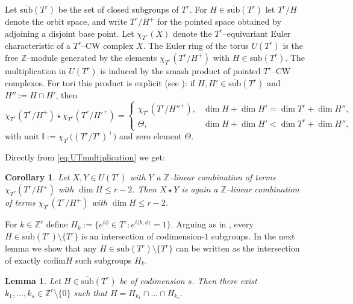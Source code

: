 \documentclass[reqno,twoside,12pt]{amsart}
\newtheorem{Corollary}[Remark]{Corollary}
\newtheorem{Lemma}[Remark]{Lemma}
\newcommand{\bI}{\mathbb{I}}
\newcommand{\bZ}{\mathbb{Z}}
\numberwithin{equation}{section} \errorcontextlines=0
\newcommand{\codim}{\mathrm{ codim  }}
\newcommand{\sub}{\overline{\mathrm{sub}}}
\begin{document}
Let $\sub(T^{r})$ be the set of closed subgroups of $T^{r}$. For $H\in\sub(T^{r})$ let $T^{r}/H$ denote the orbit space, and write $T^{r}/H^{+}$ for the pointed space obtained by adjoining a disjoint base point. Let $\chi_{T^{r}}(X)$ denote the $T^{r}$–equivariant Euler characteristic of a $T^{r}$–CW complex $X$. The Euler ring of the torus $U(T^{r})$ is the free $\mathbb{Z}$–module generated by the elements $\chi_{T^{r}}(T^{r}/H^{+})$ with $H\in\sub(T^{r})$. The multiplication in $U(T^r)$ is induced by the smash product of pointed $T^r$–CW complexes.
For tori this product is explicit (see \cite{GarRyb}): if $H,H'\in\sub(T^r)$ and $H'':=H\cap H'$, then
\begin{equation}\label{eq:UTmultiplication}
\chi_{T^r}(T^r/H^{+})\star\chi_{T^r}(T^r/H'^{+})=
\begin{cases}
\chi_{T^r}(T^r/H''^{+}), & \dim H+\dim H'=\dim T^r+\dim H'',\\[2pt]
\Theta, & \dim H+\dim H'<\dim T^r+\dim H'',
\end{cases}
\end{equation}
with unit $\bI:=\chi_{T^r}\bigl((T^r/T^r)^{+}\bigr)$ and zero element $\Theta$.

Directly from \eqref{eq:UTmultiplication} we get:

\begin{Corollary}\label{cor:bigcodim}
Let $X,Y\in U(T^r)$ with $Y$ a $\mathbb{Z}$–linear combination of terms $\chi_{T^r}(T^r/H^{+})$ with $\dim H\le r-2$.
Then $X\star Y$ is again a $\mathbb{Z}$–linear combination of terms $\chi_{T^r}(T^r/H^{+})$ with $\dim H\le r-2$.
\end{Corollary}

For $k\in\bZ^{r}$ define
$
H_k:= \{e^{i\phi}\in T^r: e^{i\langle k,\phi\rangle}=1 \}.
$
Arguing as in \cite[Remark 2.9]{GolRybSte2025}, every $H\in\sub(T^r)\setminus\{T^r\}$ is an intersection of codimension-$1$ subgroups.
In the next lemma we show that any $H\in\sub(T^r)\setminus\{T^r\}$ can be written as the intersection of exactly $\codim H$ such subgroups $H_k$.

\begin{Lemma}\label{lem:codimH}
Let $H \in \sub(T^r)$ be of codimension $s$. Then there exist
$k_1,\dots,k_s \in \mathbb{Z}^r\setminus\{0\}$ such that
$H=H_{k_1}\cap\ldots\cap H_{k_s}.$
\end{Lemma}
\end{document}
